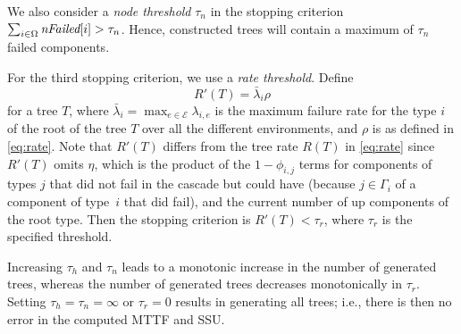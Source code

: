 \documentclass[12pt]{article}
\newcommand{\varName}[1]{\textrm{\it#1}}
\newcommand{\modelgraphlabel}[4]{$#1$ \\ $r=#2$ \\ $q=#3$ \\ $\lambda=#4$}
\newcommand{\scale}{8}
\begin{document}
We also consider a \textit{node threshold} 
$\tau_n$ in the stopping criterion 
$\sum_{i \in \Omega} \varName{nFailed}[i]
> \tau_n$.
Hence, constructed trees will
contain a maximum of $\tau_n$ 
failed components.

For the third stopping criterion,
we use a \textit{rate threshold}.
Define
\begin{equation}
\label{eq:R'}
R'(T) = \bar{\lambda}_i \rho
\end{equation}
for a tree $T$,
where $\bar{\lambda}_i
= \max_{e \in \mathcal{E}} \lambda_{i,e}$
is the maximum failure rate for
the type $i$ of the root of the tree $T$
over all the different environments,
and $\rho$ is as defined in \eqref{eq:rate}.
Note that $R'(T)$ differs from
the tree rate $R(T)$
in \eqref{eq:rate} since
$R'(T)$ omits $\eta$,
which is the
product of the $1-\phi_{i,j}$
terms for components of types $j$
that did not fail in the cascade
but could have
(because
$j \in \Gamma_i$ of a component
of type~$i$ that did fail),
and the
current number of up components
of the root type.
Then the stopping criterion is
$R'(T) < \tau_r$,
where $\tau_r$ is the specified
threshold.



Increasing $\tau_h$ and $\tau_n$ leads to a 
monotonic increase in the number of
generated trees, whereas the number of generated trees decreases monotonically
in $\tau_r$. Setting $\tau_h = \tau_n = \infty$ 
or $\tau_r = 0$ results in 
generating all trees; i.e., 
there is then no error in the 
computed MTTF and SSU.


%
\end{document}
